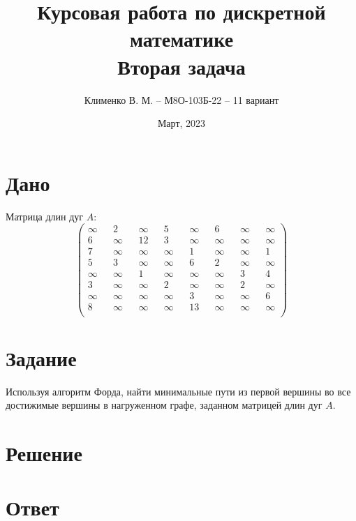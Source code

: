 \documentclass{article}
\title{Курсовая работа по дискретной математике\\Вторая задача}
\author{Клименко В. М. -- М8О-103Б-22 -- 11 вариант}
\date{Март, 2023}
\begin{document}
\maketitle


\section*{Дано}
Матрица длин дуг $A$:
$$
\begin{pmatrix}
    \infty && 2 && \infty && 5 && \infty && 6 && \infty && \infty \\
    6 && \infty && 12 && 3 && \infty && \infty && \infty && \infty \\
    7 && \infty && \infty && \infty && 1 && \infty && \infty && 1 \\
    5 && 3 && \infty && \infty && 6 && 2 && \infty && \infty \\
    \infty && \infty && 1 && \infty && \infty && \infty && 3 && 4 \\
    3 && \infty && \infty && 2 && \infty && \infty && 2 && \infty \\
    \infty && \infty && \infty && \infty && 3 && \infty && \infty && 6 \\
    8 && \infty && \infty && \infty && 13 && \infty && \infty && \infty \\
\end{pmatrix}
$$


\section*{Задание}
Используя алгоритм Форда, найти минимальные пути из первой вершины во
все достижимые вершины в нагруженном графе, заданном матрицей длин дуг $A$.


\section*{Решение}



\section*{Ответ}
\end{document}
